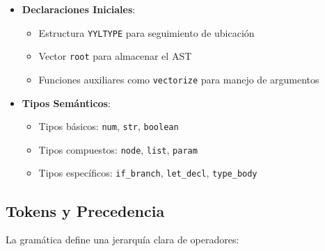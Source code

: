 \documentclass[11pt, a4paper, twoside]{article} %
\begin{document}
\begin{itemize}
    \item \textbf{Declaraciones Iniciales}:
    \begin{itemize}
        \item Estructura \texttt{YYLTYPE} para seguimiento de ubicación
        \item Vector \texttt{root} para almacenar el AST
        \item Funciones auxiliares como \texttt{vectorize} para manejo de argumentos
    \end{itemize}

    \item \textbf{Tipos Semánticos}:
    \begin{itemize}
        \item Tipos básicos: \texttt{num}, \texttt{str}, \texttt{boolean}
        \item Tipos compuestos: \texttt{node}, \texttt{list}, \texttt{param}
        \item Tipos específicos: \texttt{if\_branch}, \texttt{let\_decl}, \texttt{type\_body}
    \end{itemize}
\end{itemize}

\subsection{Tokens y Precedencia}

La gramática define una jerarquía clara de operadores:
\end{document}
